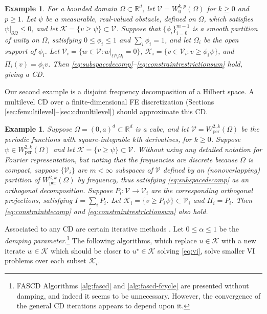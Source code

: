 \documentclass[letterpaper,final,12pt,reqno]{amsart}
\theoremstyle{cstyle}
\theoremstyle{cstyle*}
\theoremstyle{dstyle}
\newtheorem{example}[theorem]{Example}
\numberwithin{equation}{section}
\numberwithin{figure}{section}
\numberwithin{table}{section}
\numberwithin{theorem}{section}
\newcommand{\RR}{\mathbb{R}}
\newcommand{\cK}{\mathcal{K}}
\newcommand{\cV}{\mathcal{V}}
\begin{document}
\begin{example}  \label{ex:domaindecomposition}  For a bounded domain $\Omega \subset \RR^d$, let $\cV = W_0^{k,p}(\Omega)$ for $k\ge 0$ and $p\ge 1$.  Let $\psi$ be a measurable, real-valued obstacle, defined on $\Omega$, which satisfies $\psi|_{\partial \Omega} \le 0$, and let $\cK = \{v \ge \psi\} \subset \cV$.  Suppose that $\{\phi_i\}_{i=0}^{m-1}$ is a smooth partition of unity on $\Omega$, satisfying $0 \le \phi_i\le 1$ and $\sum_i \phi_i = 1$, and let $\Omega_i$ be the open support of $\phi_i$.  Let $\cV_i = \{w \in \cV:w|_{\Omega \setminus \Omega_i} =0 \}$, $\cK_i = \{v \in \cV_i: v \ge \phi_i \psi\}$, and $\Pi_i(v) = \phi_i v$.  Then \eqref{eq:subspacedecomp}--\eqref{eq:constraintrestrictionsum} hold, giving a CD.
\end{example}

Our second example is a disjoint frequency decomposition of a Hilbert space.  A multilevel CD over a finite-dimensional FE discretization (Sections \ref{sec:femultilevel}--\ref{sec:cdmultilevel}) should approximate this CD.

\begin{example}  \label{ex:frequencydecomposition}  Suppose $\Omega = (0,a)^d \subset \RR^d$ is a cube, and let $\cV = W_{\text{per}}^{2,k}(\Omega)$ be the periodic functions with square-integrable $k$th derivatives, for $k \ge 0$.  Suppose $\psi \in W_{\text{per}}^{2,k}(\Omega)$ and let $\cK = \{v \ge \psi\} \subset \cV$.  Without using any detailed notation for Fourier representation, but noting that the frequencies are discrete because $\Omega$ is compact, suppose $\{\cV_i\}$ are $m<\infty$ subspaces of $\cV$ defined by an (nonoverlapping) partition of $W_{\text{per}}^{2,k}(\Omega)$ by frequency, thus satisfying \eqref{eq:subspacedecomp} as an orthogonal decomposition.  Suppose $P_i:\cV \to \cV_i$ are the corresponding orthogonal projections, satisfying $I = \sum_i P_i$.  Let $\cK_i = \{v \ge P_i \psi\} \subset \cV_i$ and $\Pi_i = P_i$.  Then \eqref{eq:constraintdecomp} and \eqref{eq:constraintrestrictionsum} also hold.
\end{example}

Associated to any CD are certain iterative methods \cite{Tai2003,Xu1992}.  Let $0\le \alpha \le 1$ be the \emph{damping parameter}.\footnote{FASCD Algorithms \ref{alg:fascd} and \ref{alg:fascd-fcycle} are presented without damping, and indeed it seems to be unnecessary.  However, the convergence of the general CD iterations appears to depend upon it.}  The following algorithms, which replace $u \in \cK$ with a new iterate $w\in\cK$ which should be closer to $u^\star \in \cK$ solving \eqref{eq:vi}, solve smaller VI problems over each subset $\cK_i$.
\end{document}
